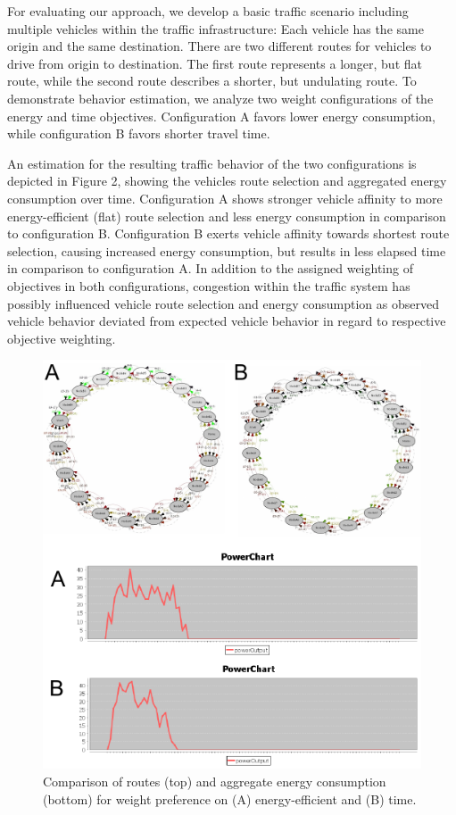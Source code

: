 \documentclass[conference]{../cls/IEEEtran}
\begin{document}
For evaluating our approach, we develop a basic traffic scenario
including multiple vehicles within the traffic infrastructure: Each vehicle has
the same origin and the same destination. There are two different
routes for vehicles to drive from origin to destination. The first route
represents a longer, but flat route, while the second route describes a shorter,
but undulating route. To demonstrate behavior estimation, we analyze two weight
configurations of the energy and time objectives. Configuration A favors lower
energy consumption, while configuration B favors shorter travel time.

An estimation for the resulting traffic behavior of the two
configurations is depicted in Figure 2, showing the vehicles route selection
and aggregated energy consumption over time. Configuration A shows
stronger vehicle affinity to more energy-efficient (flat) route selection and
less energy consumption in comparison to configuration B. Configuration B exerts
vehicle affinity towards shortest route selection, causing increased energy
consumption, but results in less elapsed time in comparison to configuration A.
In addition to the assigned weighting of objectives in both configurations,
congestion within the traffic system has possibly influenced vehicle
route selection and energy consumption as observed vehicle behavior deviated
from expected vehicle behavior in regard to respective objective weighting.

\begin{figure}[t!]
	\includegraphics[width=\columnwidth]{../gfx/results.pdf}
	\caption{Comparison of routes (top) and aggregate energy consumption
	(bottom) for weight preference  on (A) energy-efficient and (B) time.}
	\label{figure:results}
\end{figure}
\end{document}
